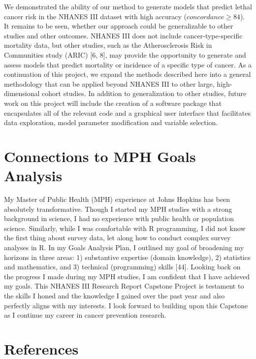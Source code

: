 \documentclass[12pt,oneside]{reedthesis}
\theoremstyle{definition}
\theoremstyle{definition}
\theoremstyle{definition}
\theoremstyle{remark}
\begin{document}
We demonstrated the ability of our method to generate models that
predict lethal cancer risk in the NHANES III dataset with high accuracy
(\(concordance \geq 84\)). It remains to be seen, whether our approach
could be generalizable to other studies and other outcomes. NHANES III
does not include cancer-type-specific mortality data, but other studies,
such as the Atherosclerosis Risk in Communities study (ARIC) {[}6, 8{]},
may provide the opportunity to generate and assess models that predict
mortality or incidence of a specific type of cancer. As a continuation
of this project, we expand the methods described here into a general
methodology that can be applied beyond NHANES III to other large,
high-dimensional cohort studies. In addition to generalization to other
studies, future work on this project will include the creation of a
software package that encapsulates all of the relevant code and a
graphical user interface that facilitates data exploration, model
parameter modification and variable selection.

\hypertarget{connections-to-mph-goals-analysis}{%
\section*{Connections to MPH Goals
Analysis}\label{connections-to-mph-goals-analysis}}

My Master of Public Health (MPH) experience at Johns Hopkins has been
absolutely transformative. Though I started my MPH studies with a strong
background in science, I had no experience with public health or
population science. Similarly, while I was comfortable with R
programming, I did not know the first thing about survey data, let along
how to conduct complex survey analyses in R. In my Goals Analysis Plan,
I outlined my goal of broadening my horizons in three areas: 1)
substantive expertise (domain knowledge), 2) statistics and mathematics,
and 3) technical (programming) skills {[}44{]}. Looking back on the
progress I made during my MPH studies, I am confident that I have
achieved my goals. This NHANES III Research Report Capstone Project is
testament to the skills I honed and the knowledge I gained over the past
year and also perfectly aligns with my interests. I look forward to
building upon this Capstone as I continue my career in cancer prevention
research.

\hypertarget{references}{%
\section*{References}\label{references}}
\end{document}
